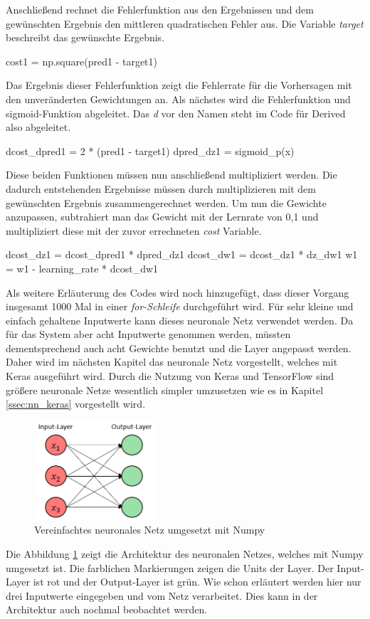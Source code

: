 Anschließend rechnet die Fehlerfunktion aus den Ergebnissen und dem gewünschten Ergebnis den mittleren quadratischen Fehler aus. Die Variable \emph{target} beschreibt das gewünschte Ergebnis.
\begin{python}
cost1 = np.square(pred1 - target1)
\end{python}
Das Ergebnis dieser Fehlerfunktion zeigt die Fehlerrate für die Vorhersagen mit den unveränderten Gewichtungen an. Als nächstes wird die Fehlerfunktion und sigmoid-Funktion abgeleitet.
Das \emph{d} vor den Namen steht im Code für Derived also abgeleitet. 
\begin{python}
dcost_dpred1 = 2 * (pred1 - target1)
dpred_dz1 = sigmoid_p(x)
\end{python}
Diese beiden Funktionen müssen nun anschließend multipliziert werden. Die dadurch entstehenden Ergebnisse müssen durch multiplizieren mit dem gewünschten Ergebnis zusammengerechnet werden. 
Um nun die Gewichte anzupassen, subtrahiert man das Gewicht mit der Lernrate von 0,1 und multipliziert diese mit der zuvor errechneten \emph{cost} Variable.
\newline
\begin{python}
dcost_dz1 = dcost_dpred1 * dpred_dz1
dcost_dw1 = dcost_dz1 * dz_dw1
w1 = w1 - learning_rate * dcost_dw1
\end{python}
Als weitere Erläuterung des Codes wird noch hinzugefügt, dass dieser Vorgang insgesamt 1000 Mal in einer \emph{for-Schleife} durchgeführt wird.
\newline
Für sehr kleine und einfach gehaltene Inputwerte kann dieses neuronale Netz verwendet werden. Da für das System aber acht Inputwerte genommen werden, müssten dementsprechend auch acht Gewichte benutzt und die Layer angepasst werden. Daher wird im nächsten Kapitel das neuronale Netz vorgestellt, welches mit Keras ausgeführt wird. Durch die Nutzung von Keras und TensorFlow sind größere neuronale Netze wesentlich simpler umzusetzen wie es in Kapitel \ref{ssec:nn_keras} vorgestellt wird.
\newline
\begin{figure}[H]
	\centering
		\includegraphics[width=0.4\textwidth]{images/einf_nn.png}
	\caption{Vereinfachtes neuronales Netz umgesetzt mit Numpy}
	\label{fig:einf_NN}
\end{figure}
\newline
Die Abbildung \ref{fig:einf_NN} zeigt die Architektur des neuronalen Netzes, welches mit Numpy umgesetzt ist. Die farblichen Markierungen zeigen die Units der Layer. Der Input-Layer ist rot und der Output-Layer ist grün. Wie schon erläutert werden hier nur drei Inputwerte eingegeben und vom Netz verarbeitet. Dies kann in der Architektur auch nochmal beobachtet werden.

